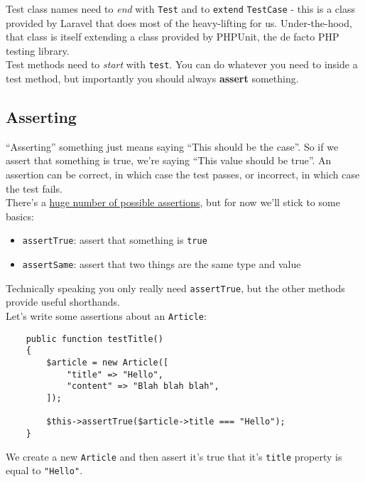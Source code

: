 Test class names need to \textit{end} with \texttt{Test} and to \texttt{extend} \texttt{TestCase} - this is a class provided by Laravel that does most of the heavy-lifting for us. Under-the-hood, that class is itself extending a class provided by PHPUnit, the de facto PHP testing library.
\\

Test methods need to \textit{start} with \texttt{test}. You can do whatever you need to inside a test method, but importantly you should always \textbf{assert} something.

\subsection{Asserting}

``Asserting'' something just means saying ``This should be the case''. So if we assert that something is true, we're saying ``This value should be true''. An assertion can be correct, in which case the test passes, or incorrect, in which case the test fails.
\\

There's a \href{https://phpunit.readthedocs.io/en/9.0/assertions.html}{huge number of possible assertions}, but for now we'll stick to some basics:

\begin{itemize}
    \item \texttt{assertTrue}: assert that something is \texttt{true}
    \item \texttt{assertSame}: assert that two things are the same type and value
\end{itemize}

Technically speaking you only really need \texttt{assertTrue}, but the other methods provide useful shorthands.
\\

Let's write some assertions about an \texttt{Article}:

\begin{verbatim}
    public function testTitle()
    {
        $article = new Article([
            "title" => "Hello",
            "content" => "Blah blah blah",
        ]);

        $this->assertTrue($article->title === "Hello");
    }
\end{verbatim}

We create a new \texttt{Article} and then assert it's true that it's \texttt{title} property is equal to \texttt{"Hello"}.
\\

